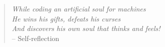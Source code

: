 \vspace*{\fill} 
\begin{quote} 
\centering 
\textit{
While coding an artificial soul for machines \\
He wins his gifts, defeats his curses \\
And discovers his own soul that thinks and feels!} \\
\hfill -- Self-reflection
\end{quote}
\vspace*{\fill}
